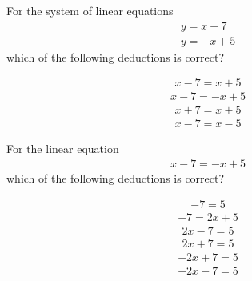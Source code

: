 \documentclass{webquiz}
\begin{document}
\begin{question} %
For the system of linear equations
\begin{gather*} 
y=x-7\\
y=-x+5
\end{gather*}
which of the following deductions is correct?
\begin{choice}[columns=1] %
\incorrect
\begin{gather*} 
x-7=x+5
\end{gather*}
\correct
\begin{gather*} 
x-7=-x+5
\end{gather*}
\incorrect
\begin{gather*} 
x+7=x+5
\end{gather*}
\incorrect
\begin{gather*} 
x-7=x-5
\end{gather*}
\end{choice}
\end{question}



\begin{question} %
For the linear equation
\begin{gather*} 
x-7=-x+5
\end{gather*}
which of the following deductions is correct?
\begin{choice}[columns=1] %
\incorrect
\begin{gather*} 
-7=5
\end{gather*}
\incorrect
\begin{gather*} 
-7=2x+5
\end{gather*}
\correct
\begin{gather*} 
2x-7=5
\end{gather*}
\incorrect
\begin{gather*} 
2x+7=5
\end{gather*}
\incorrect
\begin{gather*} 
-2x+7=5
\end{gather*}
\incorrect
\begin{gather*} 
-2x-7=5
\end{gather*}
\end{choice}
\end{question}
\end{document}
